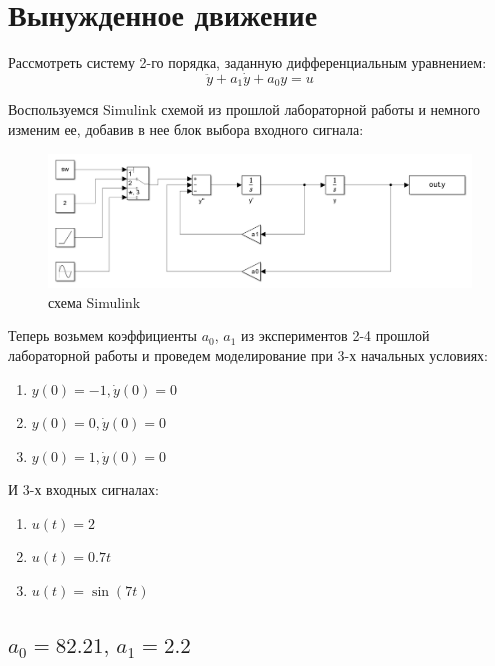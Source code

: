 \chapter{Вынужденное движение}

Рассмотреть систему 2-го порядка, заданную дифференциальным уравнением:
\[
\ddot y + a_1 \dot y + a_0 y = u
\]

Воспользуемся Simulink схемой из прошлой лабораторной работы и 
немного изменим ее, добавив в нее блок выбора входного сигнала:

\begin{figure}[ht]
    \centering
    \includegraphics[width=1\textwidth, trim={0cm 0cm 0cm 0cm}]{../images/sim1}
    \caption{схема Simulink}
    \label{fig:sim1}
\end{figure}

Теперь возьмем коэффициенты $a_0$, $a_1$ из экспериментов 2-4 прошлой лабораторной
работы и проведем моделирование при 3-х начальных условиях:
\begin{enumerate}
    \item $y(0) = -1, \dot y(0) = 0$
    \item $y(0) = 0, \dot y(0) = 0$
    \item $y(0) = 1, \dot y(0) = 0$
\end{enumerate}

И 3-х входных сигналах:
\begin{enumerate}
    \item $u(t) = 2$
    \item $u(t) = 0.7t$
    \item $u(t) = \sin(7t)$
\end{enumerate}

\newpage
\section{$a_0 = 82.21,\, a_1 = 2.2$}

